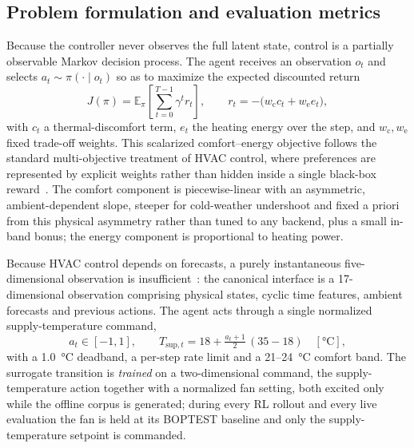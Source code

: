 \subsection{Problem formulation and evaluation metrics}\label{ssec:pomdp}
Because the controller never observes the full latent state, control is a partially observable
Markov decision process. The agent receives an observation $o_t$ and selects
$a_t\sim\pi(\cdot\mid o_t)$ so as to maximize the expected discounted return~\cite{Sutton2018RL}
\begin{equation}
J(\pi)=\mathbb{E}_{\pi}\!\left[\sum_{t=0}^{T-1}\gamma^{t} r_t\right],
\qquad r_t=-\big(w_{\mathrm{c}} c_t + w_{\mathrm{e}} e_t\big),
\label{eq:return}
\end{equation}
with $c_t$ a thermal-discomfort term, $e_t$ the heating energy over the step, and
$w_{\mathrm{c}},w_{\mathrm{e}}$ fixed trade-off weights. This scalarized comfort--energy objective
follows the standard multi-objective treatment of HVAC control, where preferences are represented by
explicit weights rather than hidden inside a single black-box
reward~\cite{Roijers2013MOSurvey,Yang2019MORL,Hayes2022MOSurvey}. The comfort component is
piecewise-linear with an asymmetric, ambient-dependent slope, steeper for cold-weather undershoot
and fixed a priori from this physical asymmetry rather than tuned to any backend, plus a small
in-band bonus; the energy component is proportional to heating power.

Because HVAC control depends on forecasts, a purely instantaneous five-dimensional observation is
insufficient~\cite{Gao2024Predictive}: the canonical interface is a 17-dimensional observation
comprising physical states, cyclic time features, ambient forecasts and previous actions. The agent
acts through a single normalized supply-temperature command,
\begin{equation}
a_t\in[-1,1], \qquad T_{\mathrm{sup},t}=18+\tfrac{a_t+1}{2}\,(35-18)\quad[\si{\celsius}],
\label{eq:action}
\end{equation}
with a \SI{1.0}{\celsius} deadband, a per-step rate limit and a 21--\SI{24}{\celsius} comfort band.
The surrogate transition is \emph{trained} on a two-dimensional command, the supply-temperature
action together with a normalized fan setting, both excited only while the offline corpus is
generated; during every RL rollout and every live evaluation the fan is held at its BOPTEST baseline
and only the supply-temperature setpoint is commanded.

